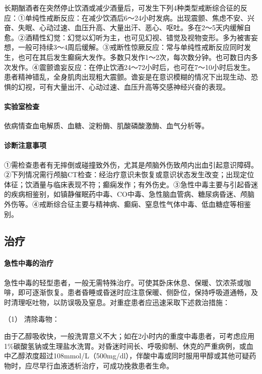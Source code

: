 长期酗酒者在突然停止饮酒或减少酒量后，可发生下列4种类型戒断综合征的反应：①单纯性戒断反应：在减少饮酒后6～24小时发病。出现震颤、焦虑不安、兴奋、失眠、心动过速、血压升高、大量出汗、恶心、呕吐。多在2～5天内缓解自愈。②酒精性幻觉：幻觉以幻听为主，也可见幻视、错觉及视物变形。多为被害妄想，一般可持续3～4周后缓解。③戒断性惊厥反应：常与单纯性戒断反应同时发生，也可在其后发生癫痫大发作。多数只发作1～2次，每次数分钟。也可数日内多次发作。④震颤谵妄反应：在停止饮酒24～72小时后，也可在7～10小时后发生。患者精神错乱，全身肌肉出现粗大震颤。谵妄是在意识模糊的情况下出现生动、恐惧的幻视，可有大量出汗、心动过速、血压升高等交感神经兴奋的表现。

\paragraph{实验室检查}

依病情查血电解质、血糖、淀粉酶、肌酸磷酸激酶、血气分析等。

\paragraph{诊断注意事项}

①需检查患者有无摔倒或碰撞致外伤，尤其是颅脑外伤致颅内出血引起意识障碍。②下列情况需行颅脑CT检查：经治疗意识未恢复或意识状态发生改变；出现定位体征；饮酒量与临床表现不符；癫痫发作；有外伤史。③急性中毒主要与引起昏迷的疾病相鉴别，如镇静催眠药中毒、CO中毒、急性脑血管病、糖尿病昏迷、颅脑外伤等。④戒断综合征主要与精神病、癫痫、窒息性气体中毒、低血糖症等相鉴别。

\subsection{治疗}

\paragraph{急性中毒的治疗}

急性中毒的轻型患者，一般无需特殊治疗。可使其卧床休息、保暖、饮浓茶或咖啡，即可逐渐恢复。患者昏睡或昏迷时应注意保暖、侧卧位，保持呼吸道通畅，及时清理呕吐物，以防误吸及窒息。对重症患者应迅速采取下述救治措施：

\hypertarget{text00151.htmlux5cux23CHP5-5-1-3-1-1}{}
（1） 清除毒物：

由于乙醇吸收快，一般洗胃意义不大；如在2小时内的重度中毒患者，可考虑应用1\%碳酸氢钠或生理盐水洗胃。对昏迷时间长、呼吸抑制、休克的严重病例，或血中乙醇浓度超过108mmol/L（500mg/dl），伴酸中毒或同时服用甲醇或其他可疑药物时，应尽早行血液透析治疗，可成功挽救患者生命。

